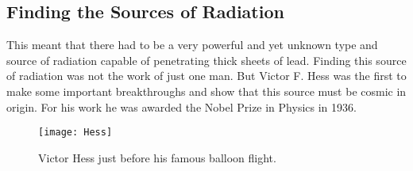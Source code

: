 \subsection{Finding the Sources of Radiation}
This meant that there had to be a very powerful and yet unknown type and source of radiation capable of penetrating thick sheets of lead. Finding this source of radiation was not the work of just one man. But Victor F. Hess was the first to make some important breakthroughs and show that this source must be cosmic in origin. For his work he was awarded the Nobel Prize in Physics in 1936.

\begin{figure}\begin{center}
\texttt{[image: Hess]}
\caption{Victor Hess just before his famous balloon flight.}\label{fig:hess}
\end{center}\end{figure}

